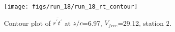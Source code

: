 \begin{figure}[H]
\centering
\texttt{[image: figs/run\_18/run\_18\_rt\_contour]}
\caption{Contour plot of $\overline{r^\prime t^\prime}$ at $z/c$=6.97, $V_{free}$=29.12, station 2.}
\label{fig:run_18_rt_contour}
\end{figure}


